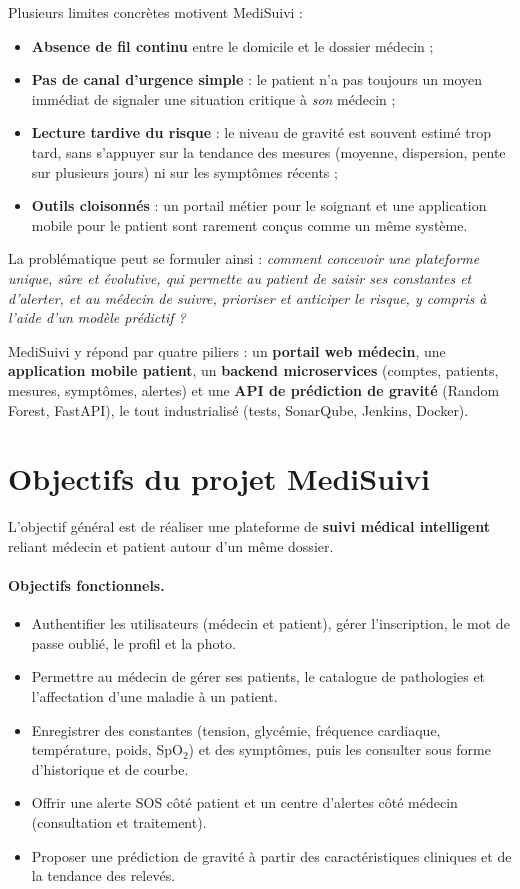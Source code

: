 \documentclass[12pt,a4paper,oneside]{report}
\begin{document}
Plusieurs limites concrètes motivent MediSuivi :
\begin{itemize}[leftmargin=1.4em]
  \item \textbf{Absence de fil continu} entre le domicile et le dossier médecin ;
  \item \textbf{Pas de canal d'urgence simple} : le patient n'a pas toujours un moyen immédiat de signaler une situation critique à \emph{son} médecin ;
  \item \textbf{Lecture tardive du risque} : le niveau de gravité est souvent estimé trop tard, sans s'appuyer sur la tendance des mesures (moyenne, dispersion, pente sur plusieurs jours) ni sur les symptômes récents ;
  \item \textbf{Outils cloisonnés} : un portail métier pour le soignant et une application mobile pour le patient sont rarement conçus comme un même système.
\end{itemize}

La problématique peut se formuler ainsi : \emph{comment concevoir une plateforme unique, sûre et évolutive, qui permette au patient de saisir ses constantes et d'alerter, et au médecin de suivre, prioriser et anticiper le risque, y compris à l'aide d'un modèle prédictif ?}

MediSuivi y répond par quatre piliers : un \textbf{portail web médecin}, une \textbf{application mobile patient}, un \textbf{backend microservices} (comptes, patients, mesures, symptômes, alertes) et une \textbf{API de prédiction de gravité} (Random Forest, FastAPI), le tout industrialisé (tests, SonarQube, Jenkins, Docker).

\section{Objectifs du projet MediSuivi}

L'objectif général est de réaliser une plateforme de \textbf{suivi médical intelligent} reliant médecin et patient autour d'un même dossier.

\paragraph{Objectifs fonctionnels.}
\begin{itemize}[leftmargin=1.4em]
  \item Authentifier les utilisateurs (médecin et patient), gérer l'inscription, le mot de passe oublié, le profil et la photo.
  \item Permettre au médecin de gérer ses patients, le catalogue de pathologies et l'affectation d'une maladie à un patient.
  \item Enregistrer des constantes (tension, glycémie, fréquence cardiaque, température, poids, SpO$_2$) et des symptômes, puis les consulter sous forme d'historique et de courbe.
  \item Offrir une alerte SOS côté patient et un centre d'alertes côté médecin (consultation et traitement).
  \item Proposer une prédiction de gravité à partir des caractéristiques cliniques et de la tendance des relevés.
\end{itemize}
\end{document}
